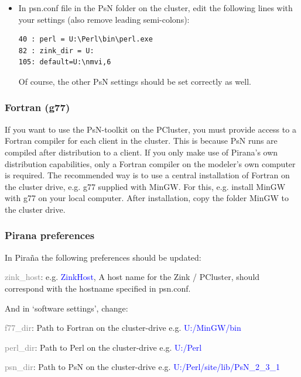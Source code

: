 \documentclass[a4,11pt]{report} \usepackage[pdftex]{graphicx}
\begin{document}
{{{\begin{itemize}
\item In psn.conf file in the PsN folder on the cluster, edit the
following lines with your settings (also remove leading semi-colons):
\begin{verbatim}
40 : perl = U:\Perl\bin\perl.exe
82 : zink_dir = U:
105: default=U:\nmvi,6
\end{verbatim} Of course, the other PsN settings should be set correctly as well.

\end{itemize}

\subsubsection*{Fortran (g77)} If you want to use the PsN-toolkit on
the PCluster, you must provide access to a Fortran compiler for each
client in the cluster. This is because PsN runs are compiled after
distribution to a client. If you only make use of Pirana's own
distribution capabilities, only a Fortran compiler on the modeler's
own computer is required. The recommended way is to use a central
installation of Fortran on the cluster drive, e.g. g77 supplied with
MinGW. For this, e.g. install MinGW with g77 on your local
computer. After installation, copy the folder MinGW to the cluster
drive.

\subsubsection*{Pirana preferences} In Pira\~na the following
preferences should be updated:
\begin{description}
	\item \textcolor{Grey}{zink\_host}:
e.g. \textcolor{Blue}{ZinkHost}, A host name for the Zink / PCluster,
should correspond with the hostname specified in psn.conf.
\end{description}
\noindent And in `software settings', change:
\begin{description}
  \item \textcolor{Grey}{f77\_dir}: Path to Fortran on the
cluster-drive e.g.  \textcolor{Blue}{U:/MinGW/bin}
  \item \textcolor{Grey}{perl\_dir}: Path to Perl on the cluster-drive
e.g.  \textcolor{Blue}{U:/Perl}
  \item \textcolor{Grey}{psn\_dir}: Path to PsN on the cluster-drive
e.g.  \textcolor{Blue}{U:/Perl/site/lib/PsN\_2\_3\_1}
\end{description}

}}}
\end{document}
